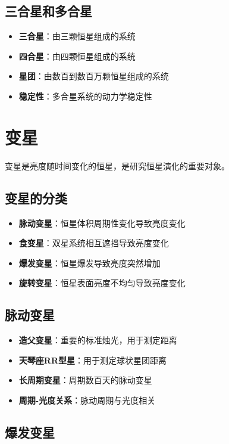 \documentclass[12pt,UTF8]{ctexbook}
\begin{document}
\subsection{三合星和多合星}

\begin{itemize}
  \item \textbf{三合星}：由三颗恒星组成的系统
  \item \textbf{四合星}：由四颗恒星组成的系统
  \item \textbf{星团}：由数百到数百万颗恒星组成的系统
  \item \textbf{稳定性}：多合星系统的动力学稳定性
\end{itemize}

\section{变星}

变星是亮度随时间变化的恒星，是研究恒星演化的重要对象。

\subsection{变星的分类}

\begin{itemize}
  \item \textbf{脉动变星}：恒星体积周期性变化导致亮度变化
  \item \textbf{食变星}：双星系统相互遮挡导致亮度变化
  \item \textbf{爆发变星}：恒星爆发导致亮度突然增加
  \item \textbf{旋转变星}：恒星表面亮度不均匀导致亮度变化
\end{itemize}

\subsection{脉动变星}

\begin{itemize}
  \item \textbf{造父变星}：重要的标准烛光，用于测定距离
  \item \textbf{天琴座RR型星}：用于测定球状星团距离
  \item \textbf{长周期变星}：周期数百天的脉动变星
  \item \textbf{周期-光度关系}：脉动周期与光度相关
\end{itemize}

\subsection{爆发变星}
\end{document}
